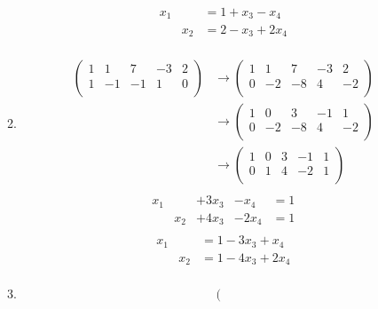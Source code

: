 \documentclass{article}
\begin{document}
\begin{enumerate}[(i)]
\begin{enumerate}
\[    \]
    \[
      \begin{array}{lll}
        x_1 &     &= 1 + x_3 - x_4  \\
            & x_2 &= 2 - x_3 + 2x_4 \\
      \end{array}
    \]
  \item
    \begin{align*}
      \left(
      \begin{array}{cccc|c}
        1 & 1  & 7  & -3 & 2 \\
        1 & -1 & -1 & 1  & 0 \\
      \end{array}
      \right)
      &\rightarrow
      \left(
      \begin{array}{cccc|c}
        1 & 1  & 7  & -3 & 2  \\
        0 & -2 & -8 & 4  & -2 \\
      \end{array}
      \right) \\
      &\rightarrow
      \left(
      \begin{array}{cccc|c}
        1 & 0  & 3  & -1 & 1  \\
        0 & -2 & -8 & 4  & -2 \\
      \end{array}
      \right) \\
      &\rightarrow
      \left(
      \begin{array}{cccc|c}
        1 & 0 & 3 & -1 & 1 \\
        0 & 1 & 4 & -2 & 1 \\
      \end{array}
      \right) \\
    \end{align*}
    \[
      \begin{array}{lllll}
        x_1 &     &+ 3x_3 & - x_4  &= 1  \\
            & x_2 &+ 4x_3 & - 2x_4 &= 1 \\
      \end{array}
    \]
    \[
      \begin{array}{lll}
        x_1 &     &= 1 - 3x_3 + x_4  \\
            & x_2 &= 1 - 4x_3 + 2x_4 \\
      \end{array}
    \]
  \item
    \begin{align*}
      \left(
      \begin{array}{cccc|c}

\end{array}
\end{align*}
\end{enumerate}
\end{enumerate}
\end{document}
